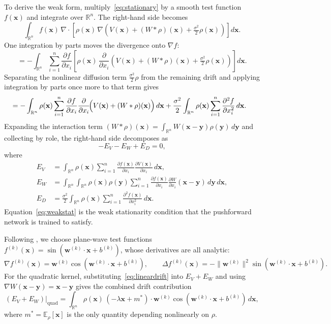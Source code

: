 \documentclass[12pt]{article}
\newcommand{\bx}{\mathbf{x}}
\newcommand{\by}{\mathbf{y}}
\newcommand{\bw}{\mathbf{w}}
\newcommand{\E}{\mathbb{E}}
\newcommand{\Rn}{\mathbb{R}^n}
\theoremstyle{plain}
\begin{document}
To derive the weak form, multiply~\eqref{eq:stationary} by a smooth test function
$f(\bx)$ and integrate over $\Rn$. The right-hand side becomes
\begin{equation*}
  \int_{\Rn} f(\bx)\,\nabla\cdot\!\left[\rho(\bx)\,\nabla\!\left(
    V(\bx) + (W*\rho)(\bx) + \tfrac{\sigma^2}{2}\rho(\bx)
  \right)\right]d\bx.
\end{equation*}
One integration by parts moves the divergence onto $\nabla f$:
\begin{equation*}
  = -\int_{\Rn}\sum_{i=1}^n \frac{\partial f}{\partial x_i}
    \left[\rho(\bx)\,\frac{\partial}{\partial x_i}\!\left(
      V(\bx) + (W*\rho)(\bx) + \tfrac{\sigma^2}{2}\rho(\bx)
    \right)\right]d\bx.
\end{equation*}
Separating the nonlinear diffusion term $\frac{\sigma^2}{2}\rho$ from the remaining
drift and applying integration by parts once more to that term gives
\begin{align*}
  &= -\int_{\Rn}\rho(\bx)\sum_{i=1}^n\frac{\partial f}{\partial x_i}
      \frac{\partial}{\partial x_i}\!\Bigl(V(\bx)+(W*\rho)(\bx)\Bigr)\,d\bx
   + \frac{\sigma^2}{2}\int_{\Rn}\rho(\bx)\sum_{i=1}^n
      \frac{\partial^2 f}{\partial x_i^2}\,d\bx.
\end{align*}
Expanding the interaction term $(W*\rho)(\bx)=\int_{\Rn}W(\bx-\by)\rho(\by)\,d\by$
and collecting by role, the right-hand side decomposes as
\begin{equation}
  -E_V - E_W + E_D = 0,
  \label{eq:weakstat}
\end{equation}
where
\begin{align}
  E_V &= \int_{\Rn}\rho(\bx)\sum_{i=1}^n
    \frac{\partial f(\bx)}{\partial x_i}\frac{\partial V(\bx)}{\partial x_i}\,d\bx,
    \label{eq:EV_stat}\\
  E_W &= \int_{\Rn}\!\int_{\Rn}\rho(\bx)\rho(\by)\sum_{i=1}^n
    \frac{\partial f(\bx)}{\partial x_i}\frac{\partial W}{\partial x_i}(\bx-\by)\,d\by\,d\bx,
    \label{eq:EW_stat}\\
  E_D &= \frac{\sigma^2}{2}\int_{\Rn}\rho(\bx)\sum_{i=1}^n
    \frac{\partial^2 f(\bx)}{\partial x_i^2}\,d\bx.
    \label{eq:ED_stat}
\end{align}
Equation~\eqref{eq:weakstat} is the weak stationarity condition that the pushforward
network is trained to satisfy.

Following \cite{HeCai2025}, we choose plane-wave test functions
$f^{(k)}(\bx)=\sin(\bw^{(k)}\cdot\bx+b^{(k)})$, whose derivatives are all analytic:
\begin{equation}
  \nabla f^{(k)}(\bx) = \bw^{(k)}\cos(\bw^{(k)}\cdot\bx+b^{(k)}),
  \qquad
  \Delta f^{(k)}(\bx) = -\|\bw^{(k)}\|^2\sin(\bw^{(k)}\cdot\bx+b^{(k)}).
  \label{eq:planewavederiv}
\end{equation}
For the quadratic kernel, substituting~\eqref{eq:lineardrift} into $E_V+E_W$ and using
$\nabla W(\bx-\by)=\bx-\by$ gives the combined drift contribution
\begin{equation}
  (E_V+E_W)\big|_\text{quad}
  = \int_{\Rn}\rho(\bx)\,(-\lambda\bx+m^*)\cdot\bw^{(k)}\cos(\bw^{(k)}\cdot\bx+b^{(k)})\,d\bx,
  \label{eq:residual_stat}
\end{equation}
where $m^*=\E_\rho[\bx]$ is the only quantity depending nonlinearly on $\rho$.
\end{document}
